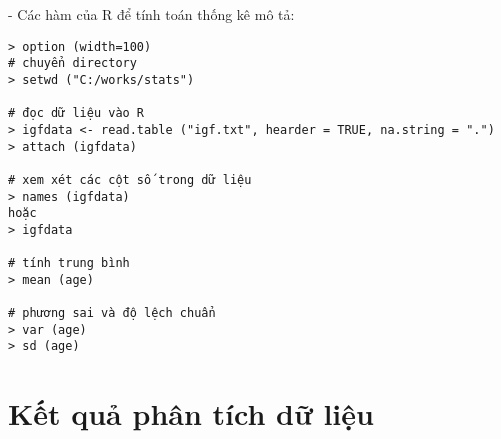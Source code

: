 \documentclass[a4paper]{article}
\begin{document}
		- Các hàm của R để tính toán thống kê mô tả:
\begin{verbatim}
> option (width=100)
# chuyển directory
> setwd ("C:/works/stats")

# đọc dữ liệu vào R
> igfdata <- read.table ("igf.txt", hearder = TRUE, na.string = ".")
> attach (igfdata)

# xem xét các cột số trong dữ liệu
> names (igfdata)
hoặc
> igfdata

# tính trung bình
> mean (age)

# phương sai và độ lệch chuẩn
> var (age)
> sd (age)
\end{verbatim}

\section{Kết quả phân tích dữ liệu}
\end{document}
